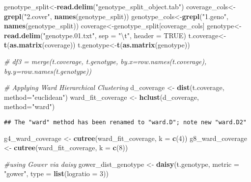\documentclass[]{article}
\newenvironment{Shaded}{\begin{snugshade}}{\end{snugshade}}
\newcommand{\KeywordTok}[1]{\textcolor[rgb]{0.13,0.29,0.53}{\textbf{{#1}}}}
\newcommand{\DataTypeTok}[1]{\textcolor[rgb]{0.13,0.29,0.53}{{#1}}}
\newcommand{\DecValTok}[1]{\textcolor[rgb]{0.00,0.00,0.81}{{#1}}}
\newcommand{\CharTok}[1]{\textcolor[rgb]{0.31,0.60,0.02}{{#1}}}
\newcommand{\StringTok}[1]{\textcolor[rgb]{0.31,0.60,0.02}{{#1}}}
\newcommand{\CommentTok}[1]{\textcolor[rgb]{0.56,0.35,0.01}{\textit{{#1}}}}
\newcommand{\OtherTok}[1]{\textcolor[rgb]{0.56,0.35,0.01}{{#1}}}
\newcommand{\NormalTok}[1]{{#1}}
\begin{document}
\begin{Shaded}
\begin{Highlighting}[]
\NormalTok{genotype_split<-}\KeywordTok{read.delim}\NormalTok{(}\StringTok{"genotype_split_object.tab"}\NormalTok{)}
\NormalTok{coverage_cols<-}\KeywordTok{grepl}\NormalTok{(}\StringTok{"2.cover"}\NormalTok{, }\KeywordTok{names}\NormalTok{(genotype_split))}
\NormalTok{genotype_cols<-}\KeywordTok{grepl}\NormalTok{(}\StringTok{"1.geno"}\NormalTok{, }\KeywordTok{names}\NormalTok{(genotype_split))}
\NormalTok{coverage<-genotype_split[coverage_cols]}
\NormalTok{genotype<-}\StringTok{ }\KeywordTok{read.delim}\NormalTok{(}\StringTok{"genotype.01.txt"}\NormalTok{, }\DataTypeTok{sep =} \StringTok{"}\CharTok{\textbackslash{}t}\StringTok{"}\NormalTok{, }\DataTypeTok{header =} \OtherTok{TRUE}\NormalTok{)}
\NormalTok{t.coverage<-}\KeywordTok{t}\NormalTok{(}\KeywordTok{as.matrix}\NormalTok{(coverage))}
\NormalTok{t.genotype<-}\KeywordTok{t}\NormalTok{(}\KeywordTok{as.matrix}\NormalTok{(genotype))}


 \CommentTok{# df3 = merge(t.coverage, t.genotype, by.x=row.names(t.coverage), by.y=row.names(t.genotype))}

\CommentTok{# Applying Ward Hierarchical Clustering}
\NormalTok{d_coverage   <-}\StringTok{ }\KeywordTok{dist}\NormalTok{(t.coverage, }\DataTypeTok{method=}\StringTok{"euclidean"}\NormalTok{)}
\NormalTok{ward_fit_coverage <-}\StringTok{ }\KeywordTok{hclust}\NormalTok{(d_coverage, }\DataTypeTok{method=}\StringTok{"ward"}\NormalTok{)}
\end{Highlighting}
\end{Shaded}

\begin{verbatim}
## The "ward" method has been renamed to "ward.D"; note new "ward.D2"
\end{verbatim}

\begin{Shaded}
\begin{Highlighting}[]
\NormalTok{g4_ward_coverage <-}\StringTok{ }\KeywordTok{cutree}\NormalTok{(ward_fit_coverage, }\DataTypeTok{k =} \KeywordTok{c}\NormalTok{(}\DecValTok{4}\NormalTok{))}
\NormalTok{g8_ward_coverage <-}\StringTok{ }\KeywordTok{cutree}\NormalTok{(ward_fit_coverage, }\DataTypeTok{k =} \KeywordTok{c}\NormalTok{(}\DecValTok{8}\NormalTok{))}

\CommentTok{#using Gower via daisy}
\NormalTok{gower_dist_genotype <-}\StringTok{ }\KeywordTok{daisy}\NormalTok{(t.genotype,}
                    \DataTypeTok{metric =} \StringTok{"gower"}\NormalTok{,}
                    \DataTypeTok{type =} \KeywordTok{list}\NormalTok{(}\DataTypeTok{logratio =} \DecValTok{3}\NormalTok{))}
\end{Highlighting}
\end{Shaded}
\end{document}
